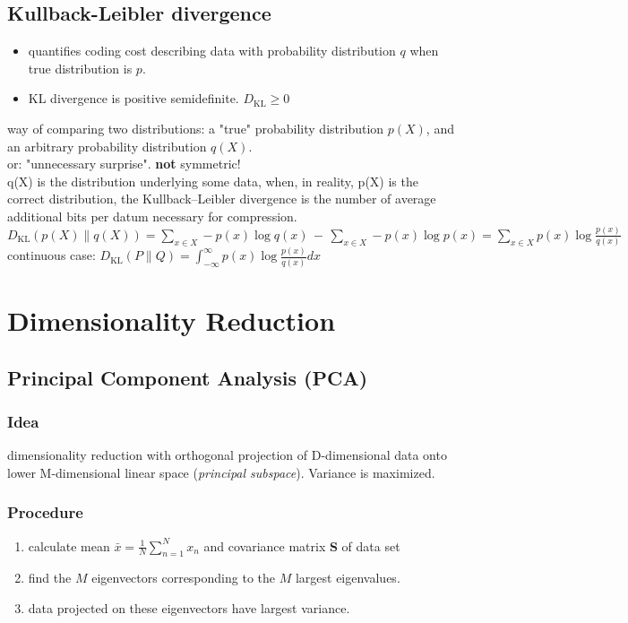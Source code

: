 \documentclass[9pt,parskip]{scrartcl}
\begin{document}
\begin{multicols*}{4}
\subsection*{Kullback-Leibler divergence}
\begin{itemize}
	\item quantifies coding cost describing data with probability distribution $q$ when true distribution is $p$.
	\item KL divergence is positive semidefinite. $D_{\mathrm {KL} } \geq 0$
\end{itemize}
way of comparing two distributions: a "true" probability distribution $p(X)$, and an arbitrary probability distribution $q(X)$. \\
or: "unnecessary surprise". \textbf{not} symmetric! \\
q(X) is the distribution underlying some data, when, in reality, p(X) is the correct distribution, the Kullback–Leibler divergence is the number of average additional bits per datum necessary for compression. \\
$D_{\mathrm {KL} }(p(X)\|q(X))=\sum _{x\in X}-p(x)\log {q(x)}\,-\,\sum _{x\in X}-p(x)\log {p(x)}=\sum _{x\in X}p(x)\log {\frac {p(x)}{q(x)}}$ \\
continuous case: $D_{\mathrm {KL} }(P\|Q)=\int _{-\infty }^{\infty }p(x) \log {\frac {p(x)}{q(x)}} dx$ \\



\section*{Dimensionality Reduction}
\subsection*{Principal Component Analysis (PCA)}
\subsubsection*{Idea}
dimensionality reduction with orthogonal projection of D-dimensional data onto lower M-dimensional linear space (\textit{principal subspace}). Variance is maximized.
\subsubsection*{Procedure}
\begin{enumerate}
	\item calculate mean $\bar{x} = \frac 1 N \sum_{n=1}^{N}x_n$ and covariance matrix \textbf{S} of data set
	\item find the $M$ eigenvectors corresponding to the $M$ largest eigenvalues.
	\item data projected on these eigenvectors have largest variance.
\end{enumerate}

\end{multicols*}
\end{document}
